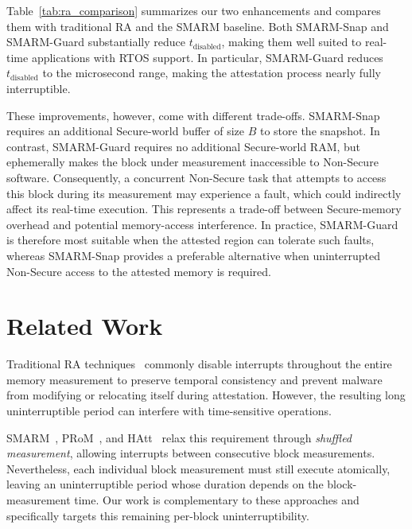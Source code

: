 \documentclass[conference]{IEEEtran}
\newcommand{\tdis}{$t_{\mathrm{disabled}}$\xspace}
\newcommand{\smarmcopy}{SMARM-Snap\xspace}
\newcommand{\smarmlock}{SMARM-Guard\xspace}
\begin{document}
Table~\ref{tab:ra_comparison} summarizes our two enhancements and compares them with traditional RA and the SMARM baseline. Both \smarmcopy{} and \smarmlock{} substantially reduce \tdis{}, making them well suited to real-time applications with RTOS support. In particular, \smarmlock{} reduces \tdis{} to the microsecond range, making the attestation process nearly fully interruptible.

These improvements, however, come with different trade-offs. \smarmcopy{} requires an additional Secure-world buffer of size $B$ to store the snapshot. In contrast, \smarmlock{} requires no additional Secure-world RAM, but ephemerally makes the block under measurement inaccessible to Non-Secure software. Consequently, a concurrent Non-Secure task that attempts to access this block during its measurement may experience a fault, which could indirectly affect its real-time execution. This represents a trade-off between Secure-memory overhead and potential memory-access interference. In practice, \smarmlock{} is therefore most suitable when the attested region can tolerate such faults, whereas \smarmcopy{} provides a preferable alternative when uninterrupted Non-Secure access to the attested memory is required.

\section{Related Work}
\label{sec:related}

Traditional RA techniques~\cite{eldefrawy2012smart,nunes2019vrased,eldefrawy2017hydra} commonly disable interrupts throughout the entire memory measurement to preserve temporal consistency and prevent malware from modifying or relocating itself during attestation. However, the resulting long uninterruptible period can interfere with time-sensitive operations.

SMARM~\cite{carpent2018smarm}, PRoM~\cite{aman2021prom}, and HAtt~\cite{aman2018hatt} relax this requirement through \emph{shuffled measurement}, allowing interrupts between consecutive block measurements. Nevertheless, each individual block measurement must still execute atomically, leaving an uninterruptible period whose duration depends on the block-measurement time.
Our work is complementary to these approaches and specifically targets this remaining per-block uninterruptibility.
\end{document}
